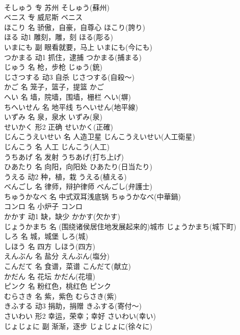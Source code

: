 \documentclass[8pt]{extreport}
\begin{document}
\begin{CJK}{UTF8}{min}
\\	そしゅう	专	苏州	そしゅう(蘇州)	
\\	ベニス	专	威尼斯	ベニス	
\\	ほこり	名	骄傲，自豪，自尊心	ほこり(誇り)	
\\	ほる	动1	雕刻，雕，刻	ほる(彫る)	
\\	いまにも	副	眼看就要，马上	いまにも(今にも)	
\\	つかまる	动1	抓住，逮捕	つかまる(捕まる)	
\\	じゅう	名	枪，步枪	じゅう(銃)	
\\	じさつする	动3	自杀	じさつする(自殺～)	
\\	かご	名	笼子，篮子，提篮	かご	
\\	へい	名	墙，院墙，围墙，栅栏	へい(塀)	
\\	ちへいせん	名	地平线	ちへいせん(地平線)	
\\	いずみ	名	泉，泉水	いずみ(泉)	
\\	せいかく	形2	正确	せいかく(正確)	
\\	じんこうえいせい	名	人造卫星	じんこうえいせい(人工衛星)	
\\	じんこう	名	人工	じんこう(人工)	
\\	うちあげ	名	发射	うちあげ(打ち上げ)	
\\	ひあたり	名	向阳，向阳处	ひあたり(日当たり)	
\\	うえる	动2	种，植，栽	うえる(植える)	
\\	べんごし	名	律师，辩护律师	べんごし(弁護士)	
\\	ちゅうかなべ	名	中式双耳浅底锅	ちゅうかなべ(中華鍋)	
\\	コンロ	名	小炉子	コンロ	
\\	かかす	动1	缺，缺少	かかす(欠かす)	
\\	じょうかまち	名	(围绕诸侯居住地发展起来的)城市	じょうかまち(城下町)	
\\	しろ	名	城，城堡	しろ(城)	
\\	しほう	名	四方	しほう(四方)	
\\	えんぶん	名	盐分	えんぶん(塩分)	
\\	こんだて	名	食谱，菜谱	こんだて(献立)	
\\	かだん	名	花坛	かだん(花壇)	
\\	ピンク	名	粉红色，桃红色	ピンク	
\\	むらさき	名	紫，紫色	むらさき(紫)	
\\	きふする	动3	捐助，捐赠	きふする(寄付～)	
\\	さいわい	形2	幸运，荣幸；幸好	さいわい(幸い)	
\\	じょじょに	副	渐渐，逐步	じょじょに(徐々に)	

\end{CJK}
\end{document}
